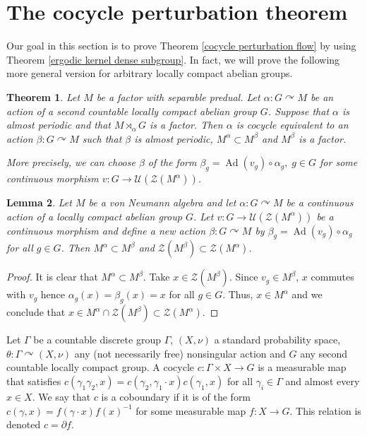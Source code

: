 \documentclass[a4paper,11pt]{amsart}
\numberwithin{equation}{section}
\newtheorem{theorem}{Theorem}[section]
\newtheorem{lemma}[theorem]{Lemma}
\theoremstyle{definition}
\newcommand{\cZ}{\mathcal{Z}}
\newcommand{\cU}{\mathcal{U}}
\newcommand{\Ad}{\operatorname{Ad}}
\begin{document}








\section{The cocycle perturbation theorem}
Our goal in this section is to prove Theorem \ref{cocycle perturbation flow} by using Theorem \ref{ergodic kernel dense subgroup}. In fact, we will prove the following more general version for arbitrary locally compact abelian groups.

\begin{theorem} \label{cocycle perturbation}
    Let $M$ be a factor with separable predual. Let $\alpha : G \curvearrowright M$ be an action of a second countable locally compact abelian group $G$. Suppose that $\alpha$ is almost periodic and that $M \rtimes_\alpha G$ is a factor. Then $\alpha$ is cocycle equivalent to an action $\beta : G \curvearrowright M$ such that $\beta$ is almost periodic, $M^\alpha \subset M^\beta$ and $M^\beta$ is a factor.

    More precisely, we can choose $\beta$ of the form $\beta_g=\Ad(v_g) \circ \alpha_g, \; g \in G$ for some continuous morphism $v : G \rightarrow \cU(\cZ(M^\alpha))$.
\end{theorem}

\begin{lemma} \label{central cocycle equivalence}
    Let $M$ be a von Neumann algebra and let $\alpha : G \curvearrowright M$ be a continuous action of a locally compact abelian group $G$. Let $v : G \rightarrow \cU(\cZ(M^\alpha))$ be a continuous morphism and define a new action $\beta : G \curvearrowright M$ by $\beta_g=\Ad(v_g) \circ \alpha_g$ for all $g \in G$. Then $M^\alpha \subset M^\beta$ and $\cZ(M^\beta) \subset \cZ(M^\alpha)$.
\end{lemma}
\begin{proof}
    It is clear that $M^\alpha \subset M^\beta$. Take $x \in \cZ(M^\beta)$. Since $v_g \in M^\beta$, $x$ commutes with $v_g$ hence $\alpha_g(x)=\beta_g(x)=x$ for all $g \in G$. Thus, $x \in M^\alpha$ and we conclude that $x \in M^\alpha \cap \cZ(M^\beta) \subset \cZ(M^\alpha)$.
\end{proof}


Let $\Gamma$ be a countable discrete group $\Gamma$, $(X, \nu)$ a standard probability space, $\theta : \Gamma \curvearrowright (X, \nu)$ any (not necessarily free) nonsingular action and $G$ any second countable locally compact group. A cocycle $c : \Gamma \times X \to G$ is a measurable map that satisfies $c(\gamma_1 \gamma_2,x)=c(\gamma_2,\gamma_1 \cdot x)c(\gamma_1,x)$ for all $\gamma_i \in \Gamma$ and almost every $x \in X$. We say that $c$ is a coboundary if it is of the form $c(\gamma,x)=f(\gamma \cdot x) f(x)^{-1}$ for some measurable map $f : X \rightarrow G$. This relation is denoted $c=\partial f$.
\end{document}
